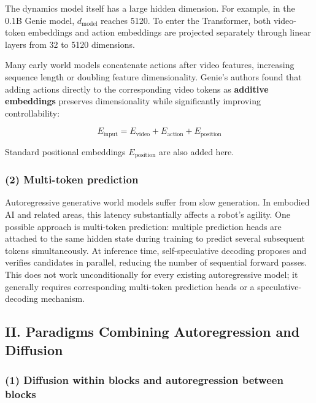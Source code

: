 The dynamics model itself has a large hidden dimension. For example, in the 0.1B Genie model, \(d_{\mathrm{model}}\) reaches 5120. To enter the Transformer, both video-token embeddings and action embeddings are projected separately through linear layers from 32 to 5120 dimensions.

Many early world models concatenate actions after video features, increasing sequence length or doubling feature dimensionality. Genie's authors found that adding actions directly to the corresponding video tokens as \textbf{additive embeddings} preserves dimensionality while significantly improving controllability:

\[
E_{\mathrm{input}}=E_{\mathrm{video}}+E_{\mathrm{action}}+E_{\mathrm{position}}
\]

Standard positional embeddings \(E_{\mathrm{position}}\) are also added here.

\hypertarget{multi-token-prediction-1}{%
\subsubsection{(2) Multi-token prediction}\label{multi-token-prediction-1}}

Autoregressive generative world models suffer from slow generation. In embodied AI and related areas, this latency substantially affects a robot's agility. One possible approach is multi-token prediction: multiple prediction heads are attached to the same hidden state during training to predict several subsequent tokens simultaneously. At inference time, self-speculative decoding proposes and verifies candidates in parallel, reducing the number of sequential forward passes. This does not work unconditionally for every existing autoregressive model; it generally requires corresponding multi-token prediction heads or a speculative-decoding mechanism.

\hypertarget{ii.-paradigms-combining-autoregression-and-diffusion}{%
\subsection{II. Paradigms Combining Autoregression and Diffusion}\label{ii.-paradigms-combining-autoregression-and-diffusion}}

\hypertarget{diffusion-within-blocks-and-autoregression-between-blocks}{%
\subsubsection{(1) Diffusion within blocks and autoregression between blocks}\label{diffusion-within-blocks-and-autoregression-between-blocks}}

